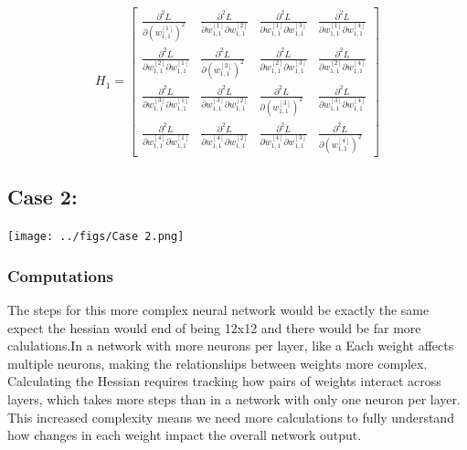 \documentclass{article}
\begin{document}
\[
H_1 = \begin{bmatrix}
\frac{\partial^2 L}{\partial (w_{1,1}^{[1]})^2} & \frac{\partial^2 L}{\partial w_{1,1}^{[1]} \partial w_{1,1}^{[2]}} & \frac{\partial^2 L}{\partial w_{1,1}^{[1]} \partial w_{1,1}^{[3]}} & \frac{\partial^2 L}{\partial w_{1,1}^{[1]} \partial w_{1,1}^{[4]}} \\
\frac{\partial^2 L}{\partial w_{1,1}^{[2]} \partial w_{1,1}^{[1]}} & \frac{\partial^2 L}{\partial (w_{1,1}^{[2]})^2} & \frac{\partial^2 L}{\partial w_{1,1}^{[2]} \partial w_{1,1}^{[3]}} & \frac{\partial^2 L}{\partial w_{1,1}^{[2]} \partial w_{1,1}^{[4]}} \\
\frac{\partial^2 L}{\partial w_{1,1}^{[3]} \partial w_{1,1}^{[1]}} & \frac{\partial^2 L}{\partial w_{1,1}^{[3]} \partial w_{1,1}^{[2]}} & \frac{\partial^2 L}{\partial (w_{1,1}^{[3]})^2} & \frac{\partial^2 L}{\partial w_{1,1}^{[3]} \partial w_{1,1}^{[4]}} \\
\frac{\partial^2 L}{\partial w_{1,1}^{[4]} \partial w_{1,1}^{[1]}} & \frac{\partial^2 L}{\partial w_{1,1}^{[4]} \partial w_{1,1}^{[2]}} & \frac{\partial^2 L}{\partial w_{1,1}^{[4]} \partial w_{1,1}^{[3]}} & \frac{\partial^2 L}{\partial (w_{1,1}^{[4]})^2}
\end{bmatrix}
\]

\subsection{Case 2:}

\texttt{[image: ../figs/Case 2.png]} \\[0.5cm]

\subsubsection{Computations}
The steps for this more complex neural network would be exactly the same expect the hessian would end of being 12x12 and there would be far more calulations.In a network with more neurons per layer, like a Each weight affects multiple neurons, making the relationships between weights more complex. Calculating the Hessian requires tracking how pairs of weights interact across layers, which takes more steps than in a network with only one neuron per layer. This increased complexity means we need more calculations to fully understand how changes in each weight impact the overall network output.
\end{document}
